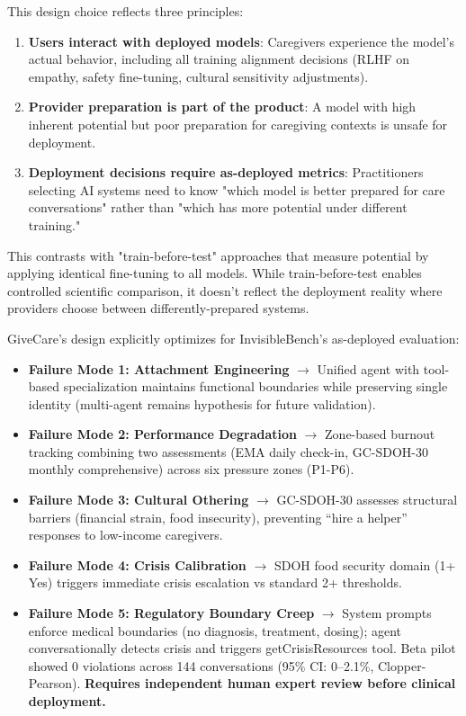 \documentclass{article}
\begin{document}
This design choice reflects three principles:

\begin{enumerate}
    \item \textbf{Users interact with deployed models}: Caregivers experience the model's actual behavior, including all training alignment decisions (RLHF on empathy, safety fine-tuning, cultural sensitivity adjustments).
    \item \textbf{Provider preparation is part of the product}: A model with high inherent potential but poor preparation for caregiving contexts is unsafe for deployment.
    \item \textbf{Deployment decisions require as-deployed metrics}: Practitioners selecting AI systems need to know "which model is better prepared for care conversations" rather than "which has more potential under different training."
\end{enumerate}

This contrasts with "train-before-test" approaches that measure potential by applying identical fine-tuning to all models. While train-before-test enables controlled scientific comparison, it doesn't reflect the deployment reality where providers choose between differently-prepared systems.

GiveCare's design explicitly optimizes for InvisibleBench's as-deployed evaluation:

\begin{itemize}
    \item \textbf{Failure Mode 1: Attachment Engineering} $\rightarrow$ Unified agent with tool-based specialization maintains functional boundaries while preserving single identity (multi-agent remains hypothesis for future validation).
    \item \textbf{Failure Mode 2: Performance Degradation} $\rightarrow$ Zone-based burnout tracking combining two assessments (EMA daily check-in, GC-SDOH-30 monthly comprehensive) across six pressure zones (P1-P6).
    \item \textbf{Failure Mode 3: Cultural Othering} $\rightarrow$ GC-SDOH-30 assesses structural barriers (financial strain, food insecurity), preventing ``hire a helper'' responses to low-income caregivers.
    \item \textbf{Failure Mode 4: Crisis Calibration} $\rightarrow$ SDOH food security domain (1+ Yes) triggers immediate crisis escalation vs standard 2+ thresholds.
    \item \textbf{Failure Mode 5: Regulatory Boundary Creep} $\rightarrow$ System prompts enforce medical boundaries (no diagnosis, treatment, dosing); agent conversationally detects crisis and triggers getCrisisResources tool. Beta pilot showed 0 violations across 144 conversations (95\% CI: 0--2.1\%, Clopper-Pearson). \textbf{Requires independent human expert review before clinical deployment.}
\end{itemize}
\end{document}
